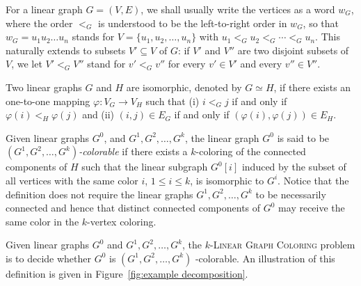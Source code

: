 For a linear graph $G = (V,E)$, we shall usually write the vertices as a
word $w_G$, where the order $<_G$ is understood to be the left-to-right order
in $w_G$,
so that $w_G = u_1 u_2 \dots u_n$ stands for
$V = \{u_1, u_2, \dots, u_n\}$ with
$u_1 <_G u_2 <_G \cdots <_G u_n$.
This naturally extends to subsets $V' \subseteq V$ of $G$:
if $V'$ and $V''$ are two disjoint subsets of $V$, we let $V' <_G V''$
stand for $v' <_G v''$ for every $v' \in V'$ and every $v'' \in V''$.

Two linear graphs $G$ and $H$ are isomorphic,
denoted by $G \simeq H$,
if there exists an one-to-one mapping
$\varphi : V_G \to V_H$ such that
(i)
$i <_G j$ if and only if $\varphi(i) <_H \varphi(j)$ and
(ii)
$(i, j) \in E_G$ if and only if $(\varphi(i), \varphi(j)) \in E_H$.

Given linear graphs $G^0$, and $G^1, G^2, \dots, G^k$,
the linear graph $G^0$ is said to be
\emph{$(G^1, G^2, \ldots, G^k)$-colorable}
if there exists a $k$-coloring of the connected components of $H$ such that
the linear subgraph $G^0[i]$ induced by the subset of all vertices with the
same color $i$, $1 \leq i \leq k$, is isomorphic to $G^i$.
Notice that the definition does not require the linear graphs
$G^1, G^2, \ldots, G^k$ to be necessarily connected
and hence that distinct connected components of $G^0$ may receive the
same color in the $k$-vertex coloring.

Given linear graphs $G^0$ and $G^1, G^2, \ldots, G^k$,
the \textsc{$k$-Linear Graph Coloring} problem is to decide whether $G^0$
is $(G^1, G^2, \ldots, G^k)$ -colorable.
An illustration of this definition is given in
Figure~\ref{fig:example decomposition}.


